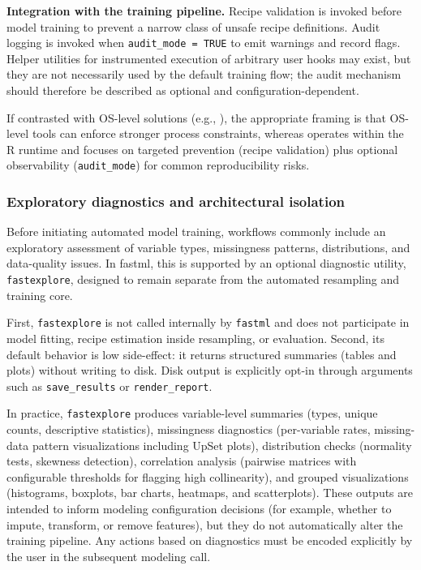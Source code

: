 \textbf{Integration with the training pipeline.}
Recipe validation is invoked before model training to prevent a narrow class of unsafe recipe definitions. Audit logging is invoked when \texttt{audit\_mode\ =\ TRUE} to emit warnings and record flags. Helper utilities for instrumented execution of arbitrary user hooks may exist, but they are not necessarily used by the default training flow; the audit mechanism should therefore be described as optional and configuration-dependent.

If contrasted with OS-level solutions (e.g.,  \citep{Ooms:2013aa}), the appropriate framing is that OS-level tools can enforce stronger process constraints, whereas  operates within the R runtime and focuses on targeted prevention (recipe validation) plus optional observability (\texttt{audit\_mode}) for common reproducibility risks.

\subsubsection{Exploratory diagnostics and architectural isolation}\label{exploratory-diagnostics-and-architectural-isolation}

Before initiating automated model training, workflows commonly include an exploratory assessment of variable types, missingness patterns, distributions, and data-quality issues. In fastml, this is supported by an optional diagnostic utility, \texttt{fastexplore}, designed to remain separate from the automated resampling and training core.

First, \texttt{fastexplore} is not called internally by \texttt{fastml} and does not participate in model fitting, recipe estimation inside resampling, or evaluation. Second, its default behavior is low side-effect: it returns structured summaries (tables and plots) without writing to disk. Disk output is explicitly opt-in through arguments such as \texttt{save\_results} or \texttt{render\_report}.

In practice, \texttt{fastexplore} produces variable-level summaries (types, unique counts, descriptive statistics), missingness diagnostics (per-variable rates, missing-data pattern visualizations including UpSet plots), distribution checks (normality tests, skewness detection), correlation analysis (pairwise matrices with configurable thresholds for flagging high collinearity), and grouped visualizations (histograms, boxplots, bar charts, heatmaps, and scatterplots). These outputs are intended to inform modeling configuration decisions (for example, whether to impute, transform, or remove features), but they do not automatically alter the training pipeline. Any actions based on diagnostics must be encoded explicitly by the user in the subsequent modeling call.

